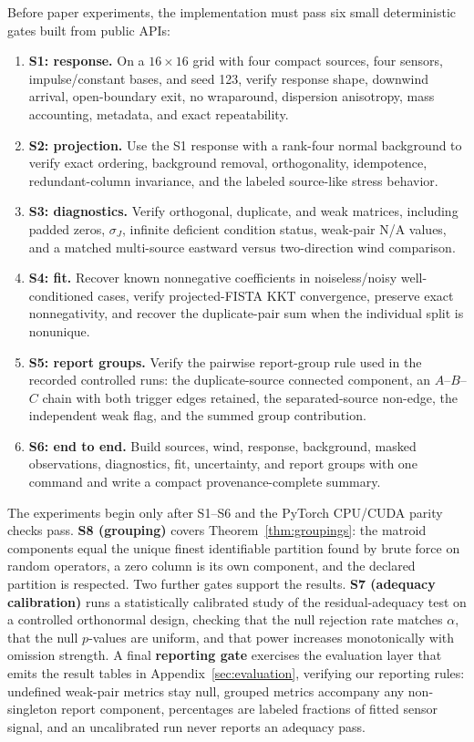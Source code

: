 Before paper experiments, the implementation must pass six small deterministic
gates built from public APIs:
\begin{enumerate}[leftmargin=*]
    \item \textbf{S1: response.}  On a \(16\times16\) grid with four compact
    sources, four sensors, impulse/constant bases, and seed 123, verify response
    shape, downwind arrival, open-boundary exit, no wraparound, dispersion
    anisotropy, mass accounting, metadata, and exact repeatability.
    \item \textbf{S2: projection.}  Use the S1 response with a rank-four normal
    background to verify exact ordering, background removal, orthogonality,
    idempotence, redundant-column invariance, and the labeled source-like stress
    behavior.
    \item \textbf{S3: diagnostics.}  Verify orthogonal, duplicate, and weak
    matrices, including padded zeros, \(\sigma_J\), infinite deficient
    condition status, weak-pair N/A values, and a matched multi-source eastward
    versus two-direction wind comparison.
    \item \textbf{S4: fit.}  Recover known nonnegative coefficients in
    noiseless/noisy well-conditioned cases, verify projected-FISTA KKT
    convergence, preserve exact nonnegativity, and recover the duplicate-pair
    sum when the individual split is nonunique.
    \item \textbf{S5: report groups.}  Verify the pairwise report-group rule used in
    the recorded controlled runs: the duplicate-source connected component, an
    \(A\)--\(B\)--\(C\) chain with both trigger edges retained, the separated-source
    non-edge, the independent weak flag, and the summed group contribution.
    \item \textbf{S6: end to end.}  Build sources, wind, response, background,
    masked observations, diagnostics, fit, uncertainty, and report groups with
    one command and write a compact provenance-complete summary.
\end{enumerate}
The experiments begin only after S1--S6 and the PyTorch CPU/CUDA parity
checks pass.  \textbf{S8 (grouping)} covers Theorem~\ref{thm:groupings}: the matroid components
equal the unique finest identifiable partition found by brute force on random
operators, a zero column is its own component, and the declared partition is
respected.  Two further gates support the results.  \textbf{S7 (adequacy
calibration)} runs a statistically calibrated study of the residual-adequacy test
on a controlled orthonormal design, checking that the null rejection rate matches
\(\alpha\), that the null \(p\)-values are uniform, and that power increases
monotonically with omission strength.  A final \textbf{reporting gate} exercises
the evaluation layer that emits the result tables in Appendix~\ref{sec:evaluation},
verifying our reporting rules: undefined weak-pair metrics stay null,
grouped metrics accompany any non-singleton report component, percentages are labeled fractions of fitted
sensor signal, and an uncalibrated run never reports an adequacy pass.

